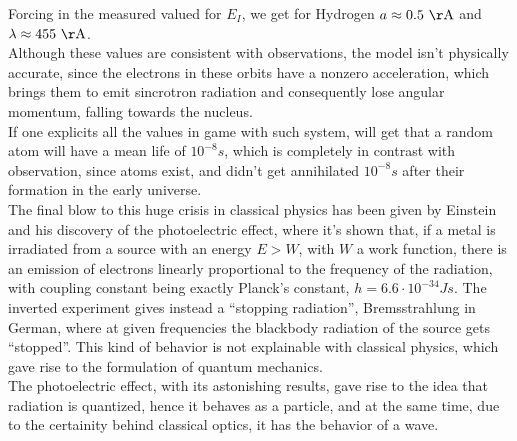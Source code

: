 \documentclass[../qm.tex]{subfiles}
\begin{document}
	Forcing in the measured valued for $E_I$, we get for Hydrogen $a\approx0.5\unit{\AA}$ and $\lambda\approx455\unit{\AA}$.\\
	Although these values are consistent with observations, the model isn't physically accurate, since the electrons in these orbits have a nonzero acceleration, which brings them to emit sincrotron radiation and consequently lose angular momentum, falling towards the nucleus.\\
	If one explicits all the values in game with such system, will get that a random atom will have a mean life of $10^{-8}\unit{s}$, which is completely in contrast with observation, since atoms exist, and didn't get annihilated $10^{-8}\unit{s}$ after their formation in the early universe.\\
	The final blow to this huge crisis in classical physics has been given by Einstein and his discovery of the photoelectric effect, where it's shown that, if a metal is irradiated from a source with an energy $E>W$, with $W$ a work function, there is an emission of electrons linearly proportional to the frequency of the radiation, with coupling constant being exactly Planck's constant, $h=6.6\cdot10^{-34}\unit{Js}$. The inverted experiment gives instead a ``stopping radiation'', Bremsstrahlung in German, where at given frequencies the blackbody radiation of the source gets ``stopped''. This kind of behavior is not explainable with classical physics, which gave rise to the formulation of quantum mechanics.\\
	The photoelectric effect, with its astonishing results, gave rise to the idea that radiation is quantized, hence it behaves as a particle, and at the same time, due to the certainity behind classical optics, it has the behavior of a wave.
\end{document}
